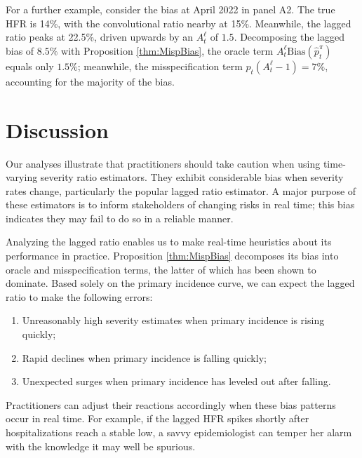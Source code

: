 \documentclass{article}
\renewcommand{\hat}{\widehat} %
\begin{document}
For a further example, consider the bias at April 2022 in panel A2. The true HFR is 14\%, with the convolutional ratio nearby at 15\%. Meanwhile, the lagged ratio peaks at 22.5\%, driven upwards by an $A_t^\ell$ of $1.5$. Decomposing the lagged bias of $8.5\%$ with Proposition \ref{thm:MispBias}, the oracle term $A_t^\ell \text{Bias}(\hat{p}_t^\pi)$ equals only $1.5\%$; meanwhile, the misspecification term $p_t(A_t^\ell-1) = 7\%$, accounting for the majority of the bias. 

\section{Discussion}

Our analyses illustrate that practitioners should take caution when using
time-varying severity ratio estimators. They exhibit considerable bias when severity rates
change, particularly the popular lagged ratio estimator. A major purpose of these
estimators is to inform stakeholders of changing risks in real time; this bias
indicates they may fail to do so in a reliable manner.

Analyzing the lagged ratio enables us to make real-time heuristics about its performance in practice. Proposition \ref{thm:MispBias} decomposes its bias into oracle and misspecification terms, the latter of which has been shown to dominate. Based solely on the primary incidence curve, we can expect the lagged ratio to make the following errors:
\begin{enumerate}
    \item Unreasonably high severity estimates when primary incidence is rising quickly;
    \item Rapid declines when primary incidence is falling quickly;
    \item Unexpected surges when primary incidence has leveled out after falling. 
\end{enumerate}

Practitioners can adjust their reactions accordingly when these bias patterns occur in real time. For example, if the lagged HFR spikes shortly after hospitalizations reach a stable low, a savvy epidemiologist can temper her alarm with the knowledge it may well be spurious.
\end{document}
